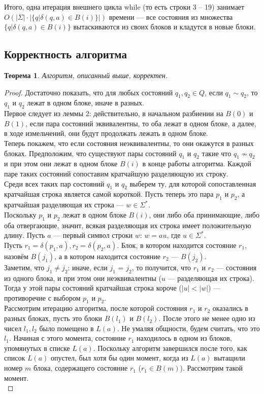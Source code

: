 \documentclass{article}
\newtheorem{theorem}{Теорема}
\begin{document}
Итого, одна итерация внешнего цикла while (то есть строки 3 -- 19) занимает $O(|\Sigma|\cdot|\{q | \delta(q, a) \in B(i)\}|)$ времени --- все состояния из множества $\{q | \delta(q, a) \in B(i)\}$ вытаскиваются из своих блоков и кладутся в новые блоки.
\subsection{Корректность алгоритма}
\begin{theorem}
  Алгоритм, описанный выше, корректен.
\end{theorem}
\begin{proof}
  Достаточно показать, что для любых состояний $q_1, q_2 \in Q$, если $q_1 \sim q_2$, то $q_1$ и $q_2$ лежат в одном блоке, иначе в разных.\\
  Первое следует из леммы 2: действительно, в начальном разбиении на $B(0)$ и $B(1)$, если пара состояний эквивалентны, то оба лежат в одном блоке, а далее, в ходе измельчений, они будут продолжать лежать в одном блоке.\\
  Теперь покажем, что если состояния неэквивалентны, то они окажутся в разных блоках. Предположим, что существуют пары состояний $q_1$ и $q_2$ такие что $q_1 \not \sim q_2$ и при этом они лежат в одном блоке $B(i)$ в конце работы алгоритма. Каждой паре таких состояний сопоставим кратчайшую разделяющую их строку.\\
  Среди всех таких пар состояний $q_1$ и $q_2$ выберем ту, для которой сопоставленная кратчайшая строка является самой короткой. Пусть теперь это пара $p_1$ и $p_2$, а кратчайшая разделяющая их строка --- $w \in \Sigma^*$.\\
  Поскольку $p_1$ и $p_2$ лежат в одном блоке $B(i)$, они либо оба принимающие, либо оба отвергающие, значит, всякая разделяющая их строка имеет положительную длину. Пусть $a$ --- первый символ строки $w$: $w = au$, где $u \in \Sigma^*$.\\
  Пусть $r_1 = \delta(p_1, a), r_2 = \delta(p_2, a)$. Блок, в котором находится состояние $r_1$, назовём $B(j_1)$, а в котором находится состояние $r_2$ --- $B(j_2)$.\\
  Заметим, что $j_1 \neq j_2$: иначе, если $j_1$ = $j_2$, то получится, что $r_1$ и $r_2$ --- состояния из одного блока, и при этом они неэквивалентны ($u$ --- разделяющая их строка). Тогда у этой пары состояний кратчайшая строка короче ($|u| < |w|$) --- противоречие с выбором $p_1$ и $p_2$.\\
  Рассмотрим итерацию алгоритма, после которой состояния $r_1$ и $r_2$ оказались в разных блоках, пусть это блоки $B(l_1)$ и $B(l_2)$. После этого не менее одно из чисел $l_1, l_2$ было помещено в $L(a)$. Не умаляя общности, будем считать, что это $l_1$. Начиная с этого момента, состояние $r_1$ находилось в одном из блоков, упомянутых в списке $L(a)$. Поскольку алгоритм завершился после того, как список $L(a)$ опустел, был хотя бы один момент, когда из $L(a)$ вытащили номер $m$ блока, содержащего состояние $r_1$ ($r_1 \in B(m)$). Рассмотрим такой момент.\\

\end{proof}
\end{document}
